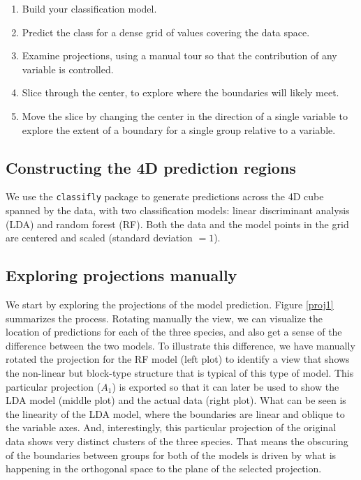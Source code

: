 \documentclass[]{interact}
\theoremstyle{plain}%
\theoremstyle{definition}
\theoremstyle{remark}
\providecommand{\tightlist}{%
  \setlength{\itemsep}{0pt}\setlength{\parskip}{0pt}}
\def\tightlist{}
\begin{document}
\begin{enumerate}
\def\labelenumi{\arabic{enumi}.}
\tightlist
\item
  Build your classification model.
\item
  Predict the class for a dense grid of values covering the data space.
\item
  Examine projections, using a manual tour so that the contribution of
  any variable is controlled.
\item
  Slice through the center, to explore where the boundaries will likely
  meet.
\item
  Move the slice by changing the center in the direction of a single
  variable to explore the extent of a boundary for a single group
  relative to a variable.
\end{enumerate}

\hypertarget{constructing-the-4d-prediction-regions}{%
\subsection{Constructing the 4D prediction
regions}\label{constructing-the-4d-prediction-regions}}

We use the \texttt{classifly} package \citep{classifly} to generate
predictions across the 4D cube spanned by the data, with two
classification models: linear discriminant analysis (LDA) and random
forest (RF). Both the data and the model points in the grid are centered
and scaled (standard deviation \(= 1\)).

\hypertarget{exploring-projections-manually}{%
\subsection{Exploring projections
manually}\label{exploring-projections-manually}}

We start by exploring the projections of the model prediction. Figure
\ref{proj1} summarizes the process. Rotating manually the view, we can
visualize the location of predictions for each of the three species, and
also get a sense of the difference between the two models. To illustrate
this difference, we have manually rotated the projection for the RF
model (left plot) to identify a view that shows the non-linear but
block-type structure that is typical of this type of model. This
particular projection (\(A_1\)) is exported so that it can later be used
to show the LDA model (middle plot) and the actual data (right plot).
What can be seen is the linearity of the LDA model, where the boundaries
are linear and oblique to the variable axes. And, interestingly, this
particular projection of the original data shows very distinct clusters
of the three species. That means the obscuring of the boundaries between
groups for both of the models is driven by what is happening in the
orthogonal space to the plane of the selected projection.
\end{document}
